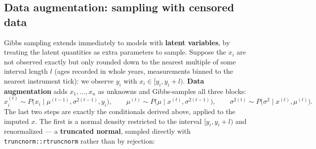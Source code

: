 \documentclass[
  letterpaper,
  DIV=11,
  numbers=noendperiod]{scrreprt}
\begin{document}
\subsection{Data augmentation: sampling with censored
data}\label{data-augmentation-sampling-with-censored-data}

Gibbs sampling extends immediately to models with \textbf{latent
variables}, by treating the latent quantities as extra parameters to
sample. Suppose the \(x_i\) are not observed exactly but only rounded
down to the nearest multiple of some interval length \(l\) (ages
recorded in whole years, measurements binned to the nearest instrument
tick): we observe \(y_i\) with \(x_i \in [y_i, y_i + l)\). \textbf{Data
augmentation} adds \(x_1,\ldots,x_n\) as unknowns and Gibbs-samples all
three blocks: \[
x_i^{(t)} \sim P\big(x_i \mid \mu^{(t-1)}, \sigma^{2(t-1)}, y_i\big), \qquad
\mu^{(t)} \sim P\big(\mu \mid x^{(t)}, \sigma^{2(t-1)}\big), \qquad
\sigma^{2(t)} \sim P\big(\sigma^2 \mid x^{(t)}, \mu^{(t)}\big).
\] The last two steps are exactly the conditionals derived above,
applied to the imputed \(x\). The first is a normal density restricted
to the interval \([y_i, y_i+l)\) and renormalized --- a
\textbf{truncated normal}, sampled directly with
\texttt{truncnorm::rtruncnorm} rather than by rejection:
\end{document}
